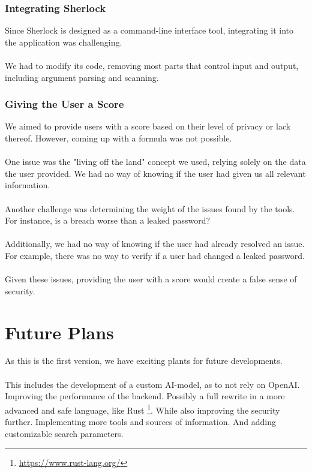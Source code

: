 \documentclass[
    a4paper,
    pagesize,
	pdftex,
    12pt,
]{scrartcl}
\begin{document}
\subsubsection{Integrating Sherlock}
Since Sherlock is designed as a command-line interface tool, integrating it into the application was challenging.
\\ \\
We had to modify its code, removing most parts that control input and output, including argument parsing and scanning.

\subsubsection{Giving the User a Score}
We aimed to provide users with a score based on their level of privacy or lack thereof.  However, coming up with a formula was not possible.
\\ \\
One issue was the "living off the land" concept we used, relying solely on the data the user provided. We had no way of knowing if the user had given us all relevant information.
\\ \\
Another challenge was determining the weight of the issues found by the tools. For instance, is a breach worse than a leaked password?
\\ \\
Additionally, we had no way of knowing if the user had already resolved an issue. For example, there was no way to verify if a user had changed a leaked password.
\\ \\
Given these issues, providing the user with a score would create a false sense of security.

\section{Future Plans}
As this is the first version, we have exciting plants for future developments.
\\ \\
This includes the development of a custom AI-model, as to not rely on OpenAI. 
Improving the performance of the backend. Possibly a full rewrite in a more advanced and safe language, like Rust \footnote{\url{https://www.rust-lang.org/}}. 
While also improving the security further. 
Implementing more tools and sources of information. 
And adding customizable search parameters.

\newpage



\end{document}

